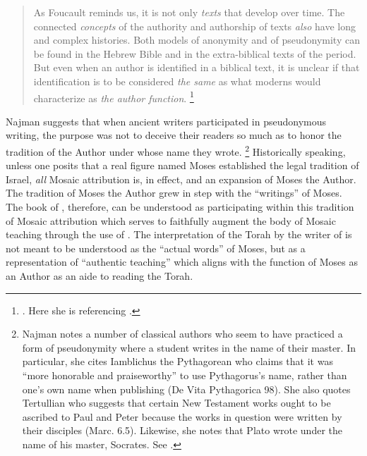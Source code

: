 \begin{quote}
    As Foucault reminds us, it is not only \emph{texts} that develop over time. The connected \emph{concepts} of the authority and authorship of texts \emph{also} have long and complex histories. Both models of anonymity and of pseudonymity can be found in the Hebrew Bible and in the extra-biblical texts of the \secondtemple period. But even when an author is identified in a biblical text, it is unclear if that identification is to be considered \emph{the same} as what moderns would characterize as \emph{the author function}.%
        \footnote{%
            \cite[9--10]{najman2003}. Here she is referencing
            \cite[213]{foucault_essential-foucault_2}.}
\end{quote}
\noindent
Najman suggests that when ancient writers participated in pseudonymous writing, the purpose was not to deceive their readers so much as to honor the tradition of the Author under whose name they wrote.%
    \footnote{%
        Najman notes a number of classical authors who seem to have practiced a form of pseudonymity where a student writes in the name of their master. In particular, she cites Iamblichus the Pythagorean who claims that it was ``more honorable and praiseworthy'' to use Pythagorus's name, rather than one's own name when publishing (De Vita Pythagorica 98). She also quotes Tertullian who suggests that certain New Testament works ought to be ascribed to Paul and Peter because the works in question were written by their disciples (Marc. 6.5). Likewise, she notes that Plato wrote under the name of his master, Socrates. See \cite[13]{najman2003}.}
Historically speaking, unless one posits that a real figure named Moses established the legal tradition of Israel, \emph{all} Mosaic attribution is, in effect, \psgraphical and an expansion of Moses the Author. The tradition of Moses the Author grew in step with the ``writings'' of Moses. The book of \jub, therefore, can be understood as participating within this tradition of Mosaic attribution which serves to faithfully augment the body of Mosaic teaching through the use of \psy. The interpretation of the Torah by the writer of \jub is not meant to be understood as the ``actual words'' of Moses, but as a representation of ``authentic teaching'' which aligns with the function of Moses as an Author as an aide to reading the Torah.\autocite[13]{najman2003}


